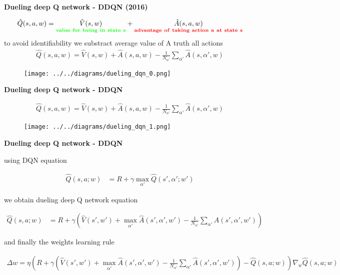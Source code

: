 \documentclass[xcolor=dvipsnames]{beamer}
\begin{document}
\begin{frame}{\bf Dueling deep Q network - DDQN (2016)}

\begin{align*}
  \hat{Q}(s, a, w) = \underset{\bf \color{green} value\ for\ being\ in\ state\ s}{\hat{V}(s, w)} + \underset{\bf \color{red} advantage\ of\ taking\ action\ a\ at\ state\ s}{\hat{A}(s, a, w)}
\end{align*}
to avoid identifiability we substract average value of A truth all actions
\begin{align*}
  \hat{Q}(s, a, w) = \hat{V}(s, w) + \hat{A}(s, a, w) - \frac{1}{N_{\alpha'}} \sum_{\alpha'} \hat{A}(s, \alpha', w)
\end{align*}

\begin{figure}[!htb]
  \centering
  \texttt{[image: ../../diagrams/dueling\_dqn\_0.png]}
  \label{img:ddqn_principle}
\end{figure}

\end{frame}

\begin{frame}{\bf Dueling deep Q network - DDQN}

\begin{align*}
  \hat{Q}(s, a, w) = \hat{V}(s, w) + \hat{A}(s, a, w) - \frac{1}{N_{\alpha'}} \sum_{\alpha'} \hat{A}(s, \alpha', w)
\end{align*}

\begin{figure}[!htb]
  \centering
  \texttt{[image: ../../diagrams/dueling\_dqn\_1.png]}
  \label{img:ddqn_full}
\end{figure}

\end{frame}


\begin{frame}{\bf Dueling deep Q network - DDQN}

using DQN equation

{\footnotesize
\begin{align*}
  \hat{Q}(s, a; w) &= R + \gamma \max \limits_{\alpha'} \hat{Q}(s', \alpha'; w')
\end{align*}
}

we obtain dueling deep Q network equation

{\footnotesize
\begin{align*}
  \hat{Q}(s, a; w)&= R + \gamma \left( \hat{V}(s', w') + \max \limits_{\alpha'} \hat{A}(s', \alpha', w') - \frac{1}{N_{\alpha'}} \sum_{\alpha'} \hat{A}(s', \alpha', w') \right)
\end{align*}
}

and finally the weights learning rule

{\tiny

\begin{align*}
  \Delta w = \eta \left( R + \gamma \left( \hat{V}(s', w') + \max \limits_{\alpha'} \hat{A}(s', \alpha', w') - \frac{1}{N_{\alpha'}} \sum_{\alpha'} \hat{A}(s', \alpha', w') \right) - \hat{Q}(s, a; w)\right) \nabla_w \hat{Q}(s, a; w)
\end{align*}
}
\end{frame}
\end{document}
